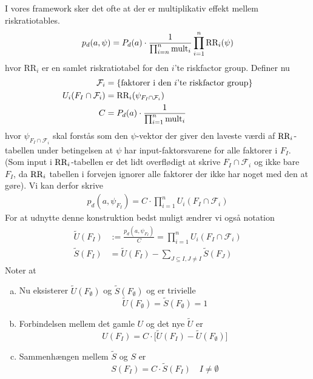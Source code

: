 \documentclass[a4paper, 12pt]{article}
\begin{document}
I vores framework sker det ofte at der er multiplikativ effekt mellem riskratiotables.
\begin{equation}
p_d(a,\psi)=P_d(a)\cdot \frac{1}{\prod_{i=n}^n \textup{mult}_i} \prod_{i=1}^n \textup{RR}_i(\psi)\label{multiplicative_groups}
\end{equation}
hvor $\text{RR}_i$ er en samlet riskratiotabel for den $i$'te riskfactor group. Definer nu 
\begin{align}
\mathcal F_i&=\{\textup{faktorer i den $i$'te riskfactor group}\}\\
U_i(F_I\cap \mathcal F_i)&=\textup{RR}_i(\psi_{F_I\cap \mathcal F_i})\\
C&=P_d(a)\cdot \frac{1}{\prod_{i=1}^n \textup{mult}_i} 
\end{align}
hvor $\psi_{F_I \cap \mathcal F_i}$ skal forstås som den $\psi$-vektor der giver den laveste værdi af $\textup{RR}_i$-tabellen under betingelsen at $\psi$ har input-faktorsvarene for alle faktorer i $F_I$. (Som input i $\textup{RR}_i$-tabellen er det lidt overflødigt at skrive $F_I\cap \mathcal F_i$ og ikke bare $F_I$, da $\textup{RR}_i$ tabellen i forvejen ignorer alle faktorer der ikke har noget med den at gøre). Vi kan derfor skrive
\begin{align}
p_d(a,\psi_{F_I})=C\cdot \prod_{i=1}^n U_i(F_I\cap \mathcal F_i)
\end{align}
For at udnytte denne konstruktion bedst muligt ændrer vi også notation 
\begin{align*}
\tilde U(F_I)&:=\frac{p_d(a,\psi_{F_I})}{C}=\prod_{i=1}^nU_i(F_I\cap \mathcal F_i)\\
\tilde S(F_I)&=\tilde U(F_I)-\sum_{J\subseteq I, J\neq I} \tilde S(F_J)
\end{align*}
Noter at 
\begin{enumerate}[a.]
\item
Nu eksisterer $\tilde U(F_{\emptyset})$ og $\tilde S(F_{\emptyset})$ og er trivielle
\begin{equation}
\tilde U(F_{\emptyset})=\tilde S(F_{\emptyset})= 1
\end{equation}
\item
Forbindelsen mellem det gamle $U$ og det nye $\tilde U$ er
\begin{equation}
U(F_I)=C\cdot \bigl[\tilde U(F_I)-\tilde U(F_{\emptyset})\bigr]
\end{equation}
\item
Sammenhængen mellem $\tilde S$ og $S$ er
\begin{equation}
S(F_I)=C\cdot \tilde S(F_I) \quad I\neq \emptyset\label{SStilde}
\end{equation}
\end{enumerate}
\end{document}
